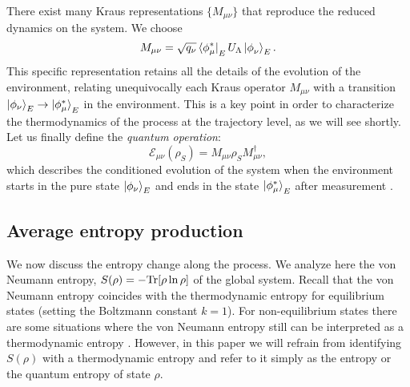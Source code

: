 \documentclass[aps,prx,twocolumn,showpacs,floatfix,superscriptaddress,graphics,longbibliography]{revtex4-1}
\newcommand{\E}{{\mathcal E}}
\newcommand{\HAT}{}
\begin{document}
There exist many Kraus representations $\{\HAT{M}_{\mu \nu}\}$ that reproduce the reduced dynamics on the system. We choose
\begin{equation}\label{k_ops}
\HAT{M}_{\mu \nu} = \sqrt{q_\nu} \bra{\phi_\mu^\ast}_{E} \HAT{U}_{\Lambda} \ket{\phi_\nu^{~}}_{E}.
\end{equation} 
This specific representation retains all the details of the  evolution of the environment, relating unequivocally each Kraus operator $\HAT{M}_{\mu \nu}$ with a transition $\ket{\phi_\nu}_E \rightarrow \ket{\phi_\mu^\ast}_E$ in the environment. 
This is a key point in order to characterize the thermodynamics of the process at the trajectory level, as we will  see shortly. Let us finally define the {\it quantum operation}:
\begin{equation}\label{q_operation}
\E_{\mu \nu}(\rho_S) = M_{\mu \nu} \rho_S M_{\mu \nu}^\dagger, 
\end{equation}
which describes the conditioned evolution of the system when the environment starts in the pure state $\ket{\phi_\nu}_E$ and ends in the state $\ket{\phi_\mu^\ast}_E$ after measurement \cite{Wiseman}.


\subsection{Average entropy production}
\label{sec:entropy}

We now discuss the entropy change along the process.  We analyze here the von Neumann entropy, $S(\rho) =- {\rm Tr}[\rho \ln \rho]$ of the global system. Recall that the von Neumann entropy coincides with the thermodynamic entropy for equilibrium states (setting the Boltzmann constant $k=1$).  
For non-equilibrium states there are some situations where the von Neumann entropy still can be interpreted as a thermodynamic entropy \cite{ThermoInfo}. However, in this paper we will refrain from identifying $S(\rho)$ with a thermodynamic entropy and refer to it simply as the entropy or the quantum entropy of state $\rho$. 
\end{document}
